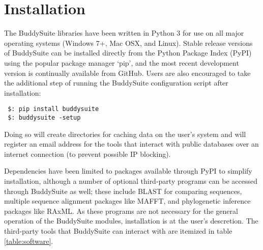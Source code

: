 \documentclass[nogrid]{MBE_article}%
\begin{document}
\section{Installation}
The BuddySuite libraries have been written in Python 3 for use on all major operating systems (Windows 7+, Mac OSX, and Linux). Stable release versions of BuddySuite can be installed directly from the Python Package Index (PyPI) using the popular package manager `pip', and the most recent development version is continually available from GitHub. Users are also encouraged to take the additional step of running the BuddySuite configuration script after installation:

\smallskip
{\small
\begin{verbatim}
 $: pip install buddysuite
 $: buddysuite -setup
\end{verbatim}
}
\smallskip

Doing so will create directories for caching data on the user's system and will register an email address for the tools that interact with public databases over an internet connection (to prevent possible IP blocking). 

Dependencies have been limited to packages available through PyPI to simplify installation, although a number of optional third-party programs can be accessed through BuddySuite as well; these include BLAST for comparing sequences, multiple sequence alignment packages like MAFFT, and phylogenetic inference packages like RAxML. As these programs are not necessary for the general operation of the BuddySuite modules, installation is at the user's descretion. The third-party tools that BuddySuite can interact with are itemized in table \ref{table:software}.
\end{document}
